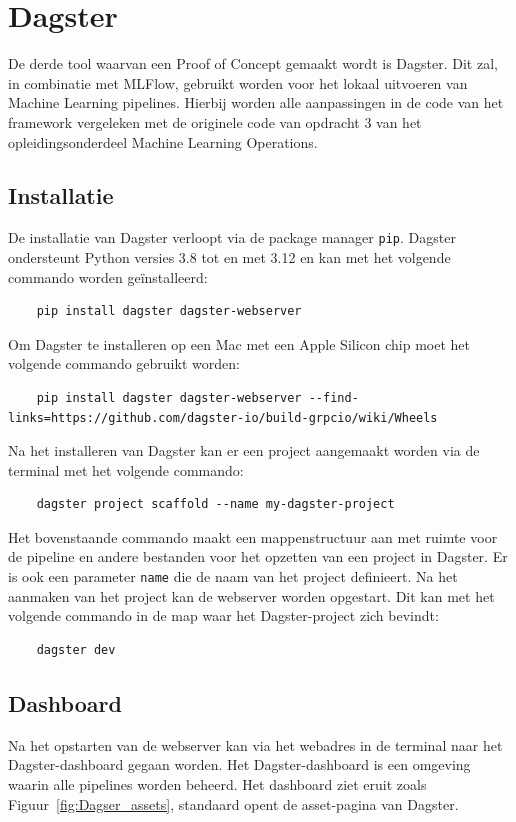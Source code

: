 \section{Dagster}
De derde tool waarvan een Proof of Concept gemaakt wordt is Dagster. Dit zal, in combinatie met MLFlow, gebruikt worden voor het lokaal uitvoeren van Machine Learning pipelines. Hierbij worden alle aanpassingen in de code van het framework vergeleken met de originele code van opdracht 3 van het opleidingsonderdeel Machine Learning Operations.
\subsection{Installatie}
De installatie van Dagster verloopt via de package manager \texttt{pip}. Dagster ondersteunt Python versies 3.8 tot en met 3.12 en kan met het volgende commando worden geïnstalleerd:
\begin{verbatim}
    pip install dagster dagster-webserver
\end{verbatim}
Om Dagster te installeren op een Mac met een Apple Silicon chip moet het volgende commando gebruikt worden:
\begin{verbatim}
    pip install dagster dagster-webserver --find-links=https://github.com/dagster-io/build-grpcio/wiki/Wheels
\end{verbatim}
Na het installeren van Dagster kan er een project aangemaakt worden via de terminal met het volgende commando:
\begin{verbatim}
    dagster project scaffold --name my-dagster-project
\end{verbatim}
Het bovenstaande commando maakt een mappenstructuur aan met ruimte voor de pipeline en andere bestanden voor het opzetten van een project in Dagster. Er is ook een parameter \texttt{name} die de naam van het project definieert.
Na het aanmaken van het project kan de webserver worden opgestart. Dit kan met het volgende commando in de map waar het Dagster-project zich bevindt:

\begin{verbatim}
    dagster dev
\end{verbatim}

\subsection{Dashboard}
Na het opstarten van de webserver kan via het webadres in de terminal naar het Dagster-dashboard gegaan worden. Het Dagster-dashboard is een omgeving waarin alle pipelines worden beheerd.
Het dashboard ziet eruit zoals Figuur~\ref{fig:Dagser_assets}, standaard opent de asset-pagina van Dagster.

